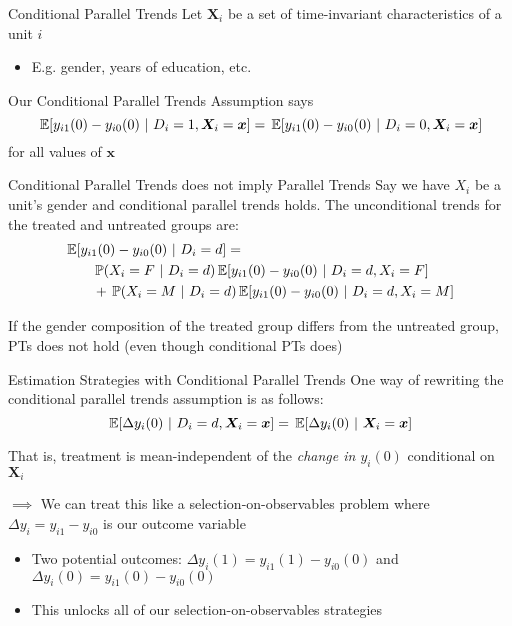 \documentclass[aspectratio=169,t,11pt,table]{beamer}
\begin{document}
\begin{frame}{Conditional Parallel Trends}
  Let $\bm{X}_i$ be a set of time-invariant characteristics of a unit $i$
  \begin{itemize}
    \item E.g. gender, years of education, etc.
  \end{itemize}

  \bigskip
  Our \alert{Conditional Parallel Trends} Assumption says
  $$
    \expec{y_{i1}(0) - y_{i0}(0)}{D_i = 1, \bm{X}_i = \bm{x}} = 
    \expec{y_{i1}(0) - y_{i0}(0)}{D_i = 0, \bm{X}_i = \bm{x}}
  $$
  for all values of $\bm{x}$ 
\end{frame}

\begin{frame}{Conditional Parallel Trends does not imply Parallel Trends}
  Say we have $X_i$ be a unit's gender and conditional parallel trends holds. The unconditional trends for the treated and untreated groups are:
  \begin{align*}
    &\expec{y_{i1}(0) - y_{i0}(0)}{D_i = d} =\\
    &\quad\quad \prob{X_i = F}{D_i = d} \expec{y_{i1}(0) - y_{i0}(0)}{D_i = d, X_i = F} \\
    &\quad\quad+ \prob{X_i = M}{D_i = d} \expec{y_{i1}(0) - y_{i0}(0)}{D_i = d, X_i = M} 
  \end{align*}

  \pause
  \bigskip
  If the gender composition of the treated group differs from the untreated group, PTs does not hold (even though conditional PTs does)
\end{frame}

\begin{frame}{Estimation Strategies with Conditional Parallel Trends}
  One way of rewriting the conditional parallel trends assumption is as follows:
  $$
    \expec{\Delta y_i(0)}{D_i = d, \bm{X}_i = \bm{x}} = \expec{\Delta y_i(0)}{\bm{X}_i = \bm{x}}
  $$

  That is, treatment is mean-independent of the \emph{change in $y_i(0)$} conditional on $\bm{X}_i$
  
  \pause
  \bigskip
  $\implies$ We can treat this like a selection-on-observables problem where $\Delta y_i = y_{i1} - y_{i0}$ is our outcome variable
  \begin{itemize}
    \item Two potential outcomes: $\Delta y_i(1) = y_{i1}(1) - y_{i0}(0)$ and $\Delta y_i(0) = y_{i1}(0) - y_{i0}(0)$
    \item This unlocks all of our selection-on-observables strategies
  \end{itemize}
\end{frame}
\end{document}
